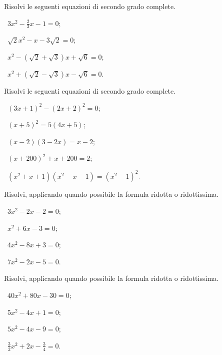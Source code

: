 \begin{esercizio}[\Ast]
 \label{ese:3.18}
Risolvi le seguenti equazioni di secondo grado complete.
\begin{multicols}{2}
 \begin{enumeratea}
 \item~$3 x^{2}-\frac{2}{3} x-1 = 0$;
 \item~$\sqrt{2} x^{2}-x-3 \sqrt{2} = 0$;
 \item~$x^{2}-(\sqrt{2} + \sqrt{3}) x + \sqrt{6} = 0$;
 \item~$x^{2} + (\sqrt{2}-\sqrt{3}) x-\sqrt{6} = 0$.
 \end{enumeratea}
 \end{multicols}
\end{esercizio}

\begin{esercizio}[\Ast]
 \label{ese:3.19}
Risolvi le seguenti equazioni di secondo grado complete.
\begin{multicols}{2}
 \begin{enumeratea}
 \item~$(3 x + 1)^{2}-(2 x + 2)^{2} = 0$;
 \item~$(x + 5)^{2} = 5 (4 x + 5)$;
 \item~$(x-2) (3-2 x) = x-2$;
 \item~$(x + 200)^{2} + x + 200 = 2$;
 \item~$(x^{2} + x + 1) (x^{2}-x-1) = (x^{2}-1)^{2}$.
 \end{enumeratea}
 \end{multicols}
\end{esercizio}

\begin{esercizio}[\Ast]
\label{ese:3.20}
Risolvi, applicando quando possibile la formula ridotta o ridottissima.
\begin{multicols}{2}
 \begin{enumeratea}
 \item~$3 x^{2}-2 x-2 = 0$;
 \item~$x^{2} + 6 x-3 = 0$;
 \item~$4 x^{2}-8 x + 3 = 0$;
 \item~$7 x^{2}-2 x-5 = 0$.
 \end{enumeratea}
 \end{multicols}
\end{esercizio}

\begin{esercizio}[\Ast]
\label{ese:3.21}
Risolvi, applicando quando possibile la formula ridotta o ridottissima.
\begin{multicols}{2}
 \begin{enumeratea}
 \item~$40 x^{2} + 80 x-30 = 0$;
 \item~$5 x^{2}-4 x + 1 = 0$;
 \item~$5 x^{2}-4 x-9 = 0$;
 \item~$\frac{3}{2} x^{2} + 2 x-\frac{3}{4} = 0$.
 \end{enumeratea}
 \end{multicols}
\end{esercizio}

